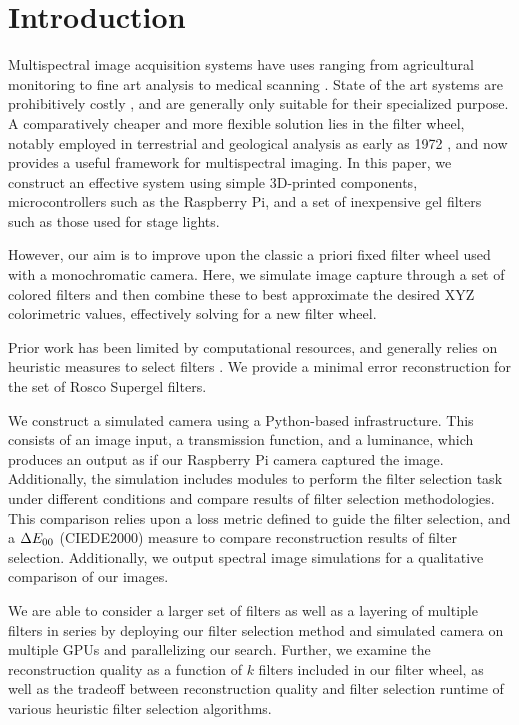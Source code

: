 \chapter{Introduction}
Multispectral image acquisition systems have uses ranging from agricultural monitoring to fine art analysis to medical scanning \cite{peyghambari2021lithological, ortega2019gastroenterology, mariotti2023forensics, qin2013foodsafety, wu2013foodfundamentals, lee2020colorluminance, wu2024headneckcancer, lu2020agriculture}.
State of the art systems are prohibitively costly \cite{SCUTELNIC2024e00596}, and are generally only suitable for their specialized purpose.
A comparatively cheaper and more flexible solution lies in the filter wheel, notably employed in terrestrial and geological analysis as early as 1972 \cite{mannheimer1977landsat}, and now provides a useful framework for
multispectral imaging. 
In this paper, we construct an effective system using simple 3D-printed components, microcontrollers such as the Raspberry Pi, and a set of inexpensive gel filters such as those used for stage lights. 

However, our aim is to improve upon the classic a priori fixed filter wheel used with a monochromatic camera.
Here, we simulate image capture through a set of colored filters and then combine these to best approximate the desired XYZ colorimetric values, effectively solving for a new filter wheel.

Prior work has been limited by computational resources, and generally relies on heuristic measures to select filters \cite{Filterselection, vrhel1994filter}.
We provide a minimal error reconstruction for the set of Rosco Supergel \cite{rosco_mycolor} filters.

We construct a simulated camera using a Python-based infrastructure. 
This consists of an image input, a transmission function, and a luminance, which produces an output as if our Raspberry Pi camera captured the image.
Additionally, the simulation includes modules to perform the filter selection task under different conditions and compare results of filter selection methodologies.
This comparison relies upon a loss metric defined to guide the filter selection, and a $\Delta E_{00}$ (CIEDE2000) measure to compare reconstruction results of filter selection. 
Additionally, we output spectral image simulations for a qualitative comparison of our images. 

We are able to consider a larger set of filters as well as a layering of multiple filters in series by deploying our filter selection method and simulated camera on multiple GPUs and parallelizing our search. 
Further, we examine the reconstruction quality as a function of $k$ filters included in our filter wheel, as well as the tradeoff between reconstruction quality and filter selection runtime of various heuristic filter selection algorithms. 

